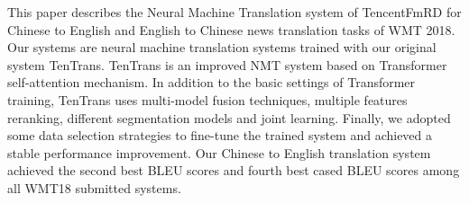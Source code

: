 This paper describes the Neural Machine Translation system of TencentFmRD for Chinese to English and English to Chinese news translation tasks of WMT 2018. Our systems are neural machine translation systems trained with our original system TenTrans. TenTrans is an improved NMT system based on Transformer self-attention mechanism.  In addition to the basic settings of Transformer training, TenTrans uses multi-model fusion techniques, multiple features reranking, different segmentation models and joint learning. Finally, we adopted some data selection strategies to fine-tune the trained system and achieved a stable performance improvement.  Our Chinese to English translation system achieved the second best BLEU scores and fourth best cased BLEU scores among all WMT18 submitted systems.
